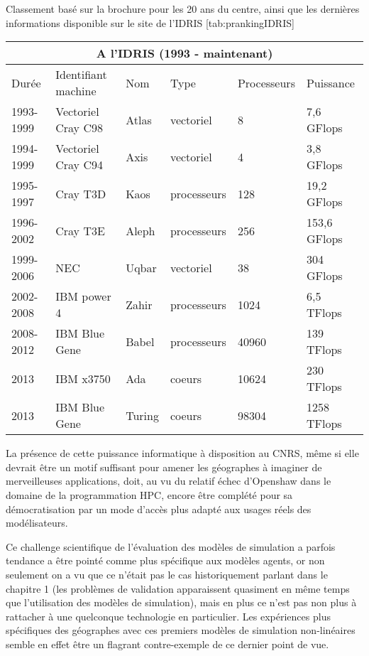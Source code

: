 \begin{table}[!htbp]
\begin{sidecaption}[fortoc]{Classement basé sur la brochure pour les 20 ans du centre, ainsi que les dernières informations disponible sur le site de l'IDRIS}
	[tab:prankingIDRIS]
	\centering
	\begin{tabular}{@{}llllll@{}}
\toprule
\multicolumn{6}{c}{A l'IDRIS (1993 - maintenant)} \\ \midrule
Durée & Identifiant machine & Nom & Type & Processeurs & Puissance \\ \midrule
1993-1999 & Vectoriel Cray C98 & Atlas & vectoriel & 8 & 7,6 GFlops \\
1994-1999 & Vectoriel Cray C94 & Axis & vectoriel & 4 & 3,8 GFlops \\
1995-1997 & Cray T3D & Kaos & processeurs & 128 & 19,2 GFlops \\
1996-2002 & Cray T3E & Aleph & processeurs & 256 & 153,6 GFlops \\
1999-2006 & NEC & Uqbar & vectoriel & 38 & 304 GFlops \\
2002-2008 & IBM power 4 & Zahir & processeurs & 1024 & 6,5 TFlops \\
2008-2012 & IBM Blue Gene & Babel & processeurs & 40960 & 139 TFlops \\
2013 & IBM x3750 & Ada & coeurs & 10624 & 230 TFlops \\
2013 & IBM Blue Gene & Turing & coeurs & 98304 & 1258 TFlops \\ \bottomrule
\end{tabular}
\end{sidecaption}
\end{table}

La présence de cette puissance informatique à disposition au CNRS, même si elle devrait être un motif suffisant pour amener les géographes à imaginer de merveilleuses applications, doit, au vu du relatif échec d'Openshaw dans le domaine de la programmation HPC, encore être complété pour sa démocratisation par un mode d'accès plus adapté aux usages réels des modélisateurs.


Ce challenge scientifique de l'évaluation des modèles de simulation a parfois tendance a être pointé comme plus spécifique aux modèles agents, or non seulement on a vu que ce n'était pas le cas historiquement parlant dans le chapitre 1 (les problèmes de validation apparaissent quasiment en même temps que l'utilisation des modèles de simulation), mais en plus ce n'est pas non plus à rattacher à une quelconque technologie en particulier. Les expériences plus spécifiques des géographes avec ces premiers modèles de simulation non-linéaires semble en effet être un flagrant contre-exemple de ce dernier point de vue.

